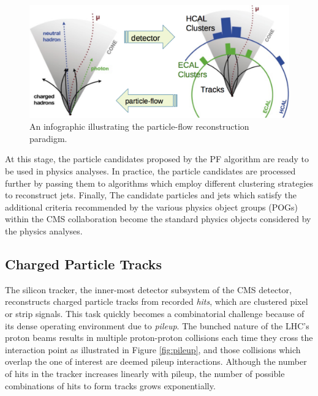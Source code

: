 \begin{figure}[htbp]
  \centering
    \includegraphics[width=5in]{images/pfdiagram}
    \caption[Particle-Flow Infographic]{An infographic illustrating the particle-flow reconstruction paradigm.\cite{pfdiagram}}
    \label{fig:pfdiagram}
\end{figure}

At this stage, the particle candidates proposed by the PF algorithm are ready to be used in physics analyses. In practice, the particle candidates are processed further by passing them to algorithms which employ different clustering strategies to reconstruct jets. Finally, The candidate particles and jets which satisfy the additional criteria recommended by the various physics object groups (POGs) within the CMS collaboration become the standard physics objects considered by the physics analyses.

\subsection{Charged Particle Tracks}

The silicon tracker, the inner-most detector subsystem of the CMS detector, reconstructs charged particle tracks from recorded \textit{hits}, which are clustered pixel or strip signals. This task quickly becomes a combinatorial challenge because of its dense operating environment due to \textit{pileup}. The bunched nature of the LHC's proton beams results in multiple proton-proton collisions each time they cross the interaction point as illustrated in Figure \ref{fig:pileup}, and those collisions which overlap the one of interest are deemed pileup interactions. Although the number of hits in the tracker increases linearly with pileup, the number of possible combinations of hits to form tracks grows exponentially.

